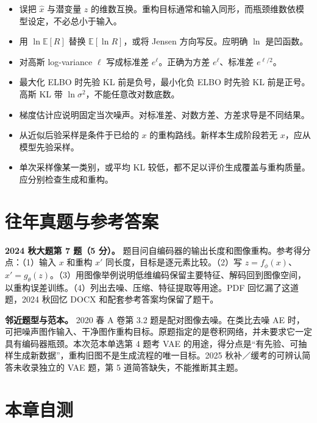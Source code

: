 \documentclass[UTF8,a4paper,zihao=-4,fontset=fandol]{ctexrep}
\begin{document}
\begin{itemize}
\item 误把 $\widehat x$ 与潜变量 $z$ 的维数互换。重构目标通常和输入同形，而瓶颈维数依模型设定，不必总小于输入。
\item 用 $\ln\mathbb E[R]$ 替换 $\mathbb E[\ln R]$，或将 Jensen 方向写反。应明确 $\ln$ 是凹函数。
\item 对高斯 log-variance $\ell$ 写成标准差 $e^\ell$。正确为方差 $e^\ell$、标准差 $e^{\ell/2}$。
\item 最大化 ELBO 时先验 KL 前是负号，最小化负 ELBO 时先验 KL 前是正号。高斯 KL 带 $\ln\sigma^2$，不能任意改对数底数。
\item 梯度估计应说明固定当次噪声。对标准差、对数方差、方差求导是不同结果。
\item 从近似后验采样是条件于已给的 $x$ 的重构路线。新样本生成阶段若无 $x$，应从模型先验采样。
\item 单次采样像某一类别，或平均 KL 较低，都不足以评价生成覆盖与重构质量。应分别检查生成和重构。
\end{itemize}

\section{往年真题与参考答案}

\textbf{2024 秋大题第 7 题（5 分）。} 题目问自编码器的输出长度和图像重构。参考得分点：（1）输入 $x$ 和重构 $x'$ 同长度，目标是逐元素比较。（2）写 $z=f_\phi(x)$、$x'=g_\theta(z)$。（3）用图像举例说明低维编码保留主要特征、解码回到图像空间，以重构误差训练。（4）列出去噪、压缩、特征提取等用途。PDF 回忆漏了这道题，2024 秋回忆 DOCX 和配套参考答案均保留了题干。

\textbf{邻近题型与范本。} 2020 春 A 卷第 3.2 题是配对图像去噪。在类比去噪 AE 时，可把噪声图作输入、干净图作重构目标。原题指定的是卷积网络，并未要求它一定具有编码器瓶颈。本次范本单选第 4 题考 VAE 的用途，得分点是“有先验、可抽样生成新数据”，重构旧图不是生成流程的唯一目标。2025 秋补／缓考的可辨认简答未收录独立的 VAE 题，第 5 道简答缺失，不能推断其主题。

\section{本章自测}
\end{document}
